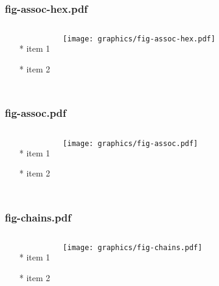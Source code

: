 \documentclass{beamer}
\begin{document}
\begin{frame} \frametitle{fig-assoc-hex.pdf}
    \begin{columns}[c]
        \begin{itemize}
            \item[*] item 1
            \item[*] item 2
        \end{itemize}
        \begin{minipage}{\linewidth}
            \begin{center}
            \texttt{[image: graphics/fig-assoc-hex.pdf]}
            \label{gfx:fig-assoc-hex.pdf}
            \end{center}
        \end{minipage}
    \end{columns}
\end{frame}
\begin{frame} \frametitle{fig-assoc.pdf}
    \begin{columns}[c]
        \begin{itemize}
            \item[*] item 1
            \item[*] item 2
        \end{itemize}
        \begin{minipage}{\linewidth}
            \begin{center}
            \texttt{[image: graphics/fig-assoc.pdf]}
            \label{gfx:fig-assoc.pdf}
            \end{center}
        \end{minipage}
    \end{columns}
\end{frame}
\begin{frame} \frametitle{fig-chains.pdf}
    \begin{columns}[c]
        \begin{itemize}
            \item[*] item 1
            \item[*] item 2
        \end{itemize}
        \begin{minipage}{\linewidth}
            \begin{center}
            \texttt{[image: graphics/fig-chains.pdf]}
            \label{gfx:fig-chains.pdf}
            \end{center}
        \end{minipage}
    \end{columns}
\end{frame}
\end{document}
